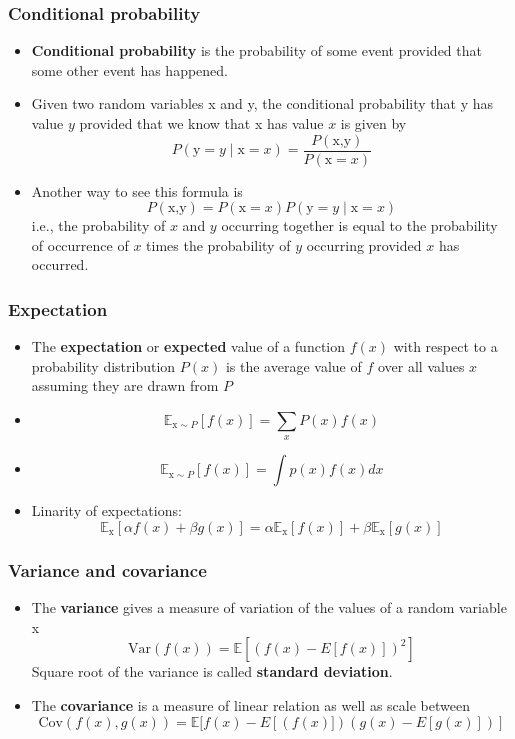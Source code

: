 \documentclass[notes]{beamer}          %
\newcommand{\field}[1]{\mathbb{#1}}
\begin{document}
\begin{frame}
\frametitle{Conditional probability}
    \begin{itemize}
        \item {\bf Conditional probability} is the probability of some event provided that some other event has happened.
        \item
        Given two random variables x and y, the conditional probability that y has value $y$ provided that we know that x has value $x$ is given by
        $$
        P(\text{y}=y \mid \text{x} = x) = \frac{P(\text{x,y})}{P(\text{x}=x)}
        $$
        \item Another way to see this formula is $$P(\text{x,y}) = P(\text{x} = x)P(\text{y} = y \mid \text{x} = x)$$ i.e., the probability of $x$ and $y$ occurring together is equal to the probability of occurrence of $x$ times the probability of $y$ occurring provided $x$ has occurred.
    \end{itemize}

\end{frame}





\begin{frame}
\frametitle{Expectation}
\begin{itemize}
    \item The {\bf expectation} or {\bf expected} value of a function $f(x)$ with respect to a probability distribution $P(x)$ is the average value of $f$ over all values $x$ assuming they are drawn from $P$
    \item $$\field{E}_{\text{x} \sim P} [f(x)] = \sum_{x} P(x) f(x)$$
    \item $$\field{E}_{\text{x} \sim P} [f(x)] = \int p(x) f(x) dx$$
    \item Linarity of expectations:
    $$\field{E}_{\text{x}} [\alpha f(x) + \beta g(x)] =  \alpha \field{E}_\text{x}[f(x)] + \beta \field{E}_\text{x}[g(x)]$$
\end{itemize}

\end{frame}



\begin{frame}
\frametitle{Variance and covariance}
\begin{itemize}
    \item The {\bf variance} gives a measure of variation of the values of a random variable x $$\mbox{Var}(f(x)) = \field{E}[(f(x) - E[f(x)])^2]$$
    Square root of the variance is called {\bf standard deviation}.

    \item The {\bf covariance} is a measure of linear relation as well as scale between $$\mbox{Cov}(f(x),g(x)) = \field{E}[f(x) - E[(f(x)])(g(x) - E[g(x)])]$$
\end{itemize}

\end{frame}
\end{document}
